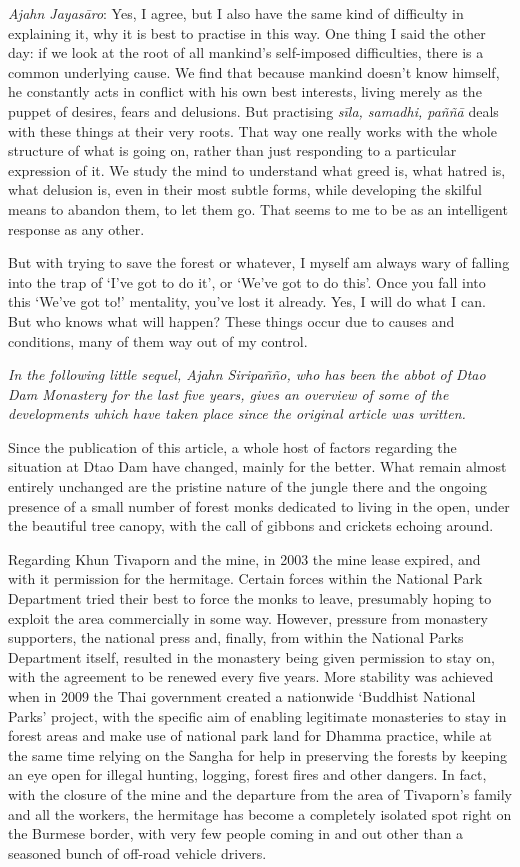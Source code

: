 \emph{Ajahn Jayasāro}: Yes, I agree, but I also have the same kind of
difficulty in explaining it, why it is best to practise in this way. One
thing I said the other day: if we look at the root of all mankind's
self-imposed difficulties, there is a common underlying cause. We find
that because mankind doesn't know himself, he constantly acts in
conflict with his own best interests, living merely as the puppet of
desires, fears and delusions. But practising \emph{sīla, samadhi, paññā}
deals with these things at their very roots. That way one really works
with the whole structure of what is going on, rather than just
responding to a particular expression of it. We study the mind to
understand what greed is, what hatred is, what delusion is, even in
their most subtle forms, while developing the skilful means to abandon
them, to let them go. That seems to me to be as an intelligent response
as any other. 

But with trying to save the forest or whatever, I myself am always wary
of falling into the trap of `I've got to do it', or `We've got to do
this'. Once you fall into this `We've got to!' mentality, you've lost it
already. Yes, I will do what I can. But who knows what will happen? 
These things occur due to causes and conditions, many of them way out of
my control. 



\emph{In the following little sequel, Ajahn Siripañño, who has been the
abbot of Dtao Dam Monastery for the last five years, gives an overview
of some of the developments which have taken place since the original
article was written.}

Since the publication of this article, a whole host of factors regarding
the situation at Dtao Dam have changed, mainly for the better. What
remain almost entirely unchanged are the pristine nature of the jungle
there and the ongoing presence of a small number of forest monks
dedicated to living in the open, under the beautiful tree canopy, with
the call of gibbons and crickets echoing around. 

Regarding Khun Tivaporn and the mine, in 2003 the mine lease expired, 
and with it permission for the hermitage. Certain forces within the
National Park Department tried their best to force the monks to leave, 
presumably hoping to exploit the area commercially in some way. However, 
pressure from monastery supporters, the national press and, finally, 
from within the National Parks Department itself, resulted in the
monastery being given permission to stay on, with the agreement to be
renewed every five years. More stability was achieved when in 2009 the
Thai government created a nationwide `Buddhist National Parks' project, 
with the specific aim of enabling legitimate monasteries to stay in
forest areas and make use of national park land for Dhamma practice, 
while at the same time relying on the Sangha for help in preserving the
forests by keeping an eye open for illegal hunting, logging, forest
fires and other dangers. In fact, with the closure of the mine and the
departure from the area of Tivaporn's family and all the workers, the
hermitage has become a completely isolated spot right on the Burmese
border, with very few people coming in and out other than a seasoned
bunch of off-road vehicle drivers. 

